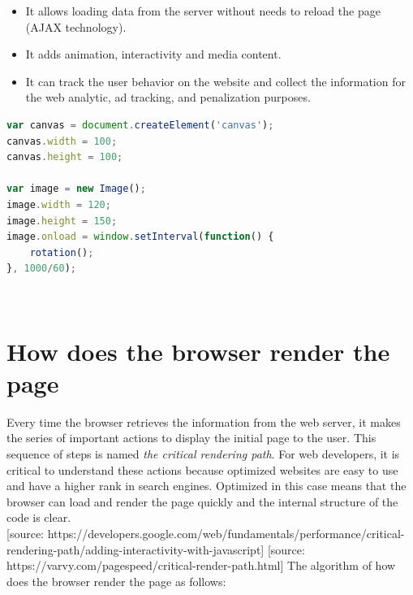 \begin{itemize}
    \item It allows loading data from the server without needs to reload the page (AJAX technology).
    \item It adds animation, interactivity and media content.
    \item It can track the user behavior on the website and collect the information for the web analytic, ad tracking, and penalization purposes.
\end{itemize}

\begin{lstlisting}[language=JavaScript, caption={Small example of JavaScript code}, label={lst:js}, captionpos=b]
var canvas = document.createElement('canvas');
canvas.width = 100;
canvas.height = 100;

var image = new Image();
image.width = 120;
image.height = 150;
image.onload = window.setInterval(function() {
    rotation();
}, 1000/60);
\end{lstlisting}\\


\section{How does the browser render the page}
\label{sec:browser}

Every time the browser retrieves the information from the web server, it makes the series of important actions to display the initial page to the user. This sequence of steps is named \textit{the critical rendering path}. For web developers, it is critical to understand these actions because optimized websites are easy to use and have a higher rank in search engines. Optimized in this case means that the browser can load and render the page quickly and the internal structure of the code is clear.\\

[source: https://developers.google.com/web/fundamentals/performance/critical-rendering-path/adding-interactivity-with-javascript]
[source: https://varvy.com/pagespeed/critical-render-path.html]
The algorithm of how does the browser render the page as follows:

